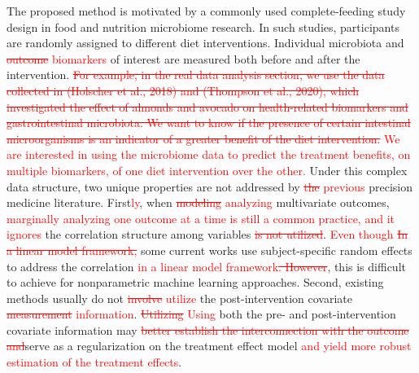 \documentclass[smallextended]{svjour3}
\newcommand{\bg}[1]{\textcolor{red}{#1}}
\begin{document}
The proposed method is motivated by a commonly used complete-feeding study design in food and nutrition microbiome research. In such studies, participants are randomly assigned to different diet interventions. Individual microbiota and \bg{\st{outcome} biomarkers} of interest are measured both before and after the intervention. \bg{\st{For example, in the real data analysis section, we use the data collected in (Holscher et al., 2018) and (Thompson et al., 2020), which investigated the effect of almonds and avocado on health-related biomarkers and gastrointestinal microbiota. We want to know if the presence of certain intestinal microorganisms is an indicator of a greater benefit of the diet intervention.} We are interested in using the microbiome data to predict the treatment benefits, on multiple biomarkers, of one diet intervention over the other.}  Under this complex data structure, two unique properties are not addressed by \bg{\st{the} previous} precision medicine literature. First\bg{ly}, when \bg{\st{modeling} analyzing} multivariate outcomes, \bg{marginally analyzing one outcome at a time is still a common practice, and it ignores} the correlation structure among variables\bg{\st{ is not utilized}}. \bg{Even though \st{In a linear model framework,}} some current works use subject-specific random effects to address the correlation \citep{zhu2016individualizing} \bg{in a linear model framework\st{. However}}, this is difficult to achieve for nonparametric machine learning approaches. Second, existing methods usually do not \bg{\st{involve} utilize} the post-intervention covariate \bg{\st{measurement} information}. \bg{\st{Utilizing} Using} both the pre- and post-intervention covariate information may \bg{\st{better establish the interconnection with the outcome and}}serve as a regularization on the treatment effect model \bg{ and yield more robust estimation of the treatment effects}. 
\end{document}
